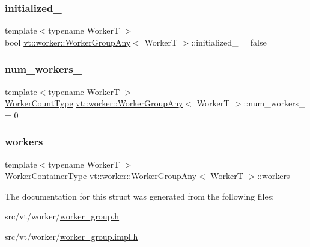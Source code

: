 \subsubsection{\texorpdfstring{initialized\+\_\+}{initialized\_}}
{\footnotesize\ttfamily template$<$typename WorkerT $>$ \\
bool \hyperlink{structvt_1_1worker_1_1_worker_group_any}{vt\+::worker\+::\+Worker\+Group\+Any}$<$ WorkerT $>$\+::initialized\+\_\+ = false\hspace{0.3cm}{\ttfamily [private]}}

\mbox{\label{structvt_1_1worker_1_1_worker_group_any_a84a8e36ce6d70e66b712ce04f224fd64}} 
\subsubsection{\texorpdfstring{num\+\_\+workers\+\_\+}{num\_workers\_}}
{\footnotesize\ttfamily template$<$typename WorkerT $>$ \\
\hyperlink{namespacevt_aa93398ea48f2cb6c188512250f7cc248}{Worker\+Count\+Type} \hyperlink{structvt_1_1worker_1_1_worker_group_any}{vt\+::worker\+::\+Worker\+Group\+Any}$<$ WorkerT $>$\+::num\+\_\+workers\+\_\+ = 0\hspace{0.3cm}{\ttfamily [private]}}

\mbox{\label{structvt_1_1worker_1_1_worker_group_any_a370802bca31db13895b73f19d699ea3b}} 
\subsubsection{\texorpdfstring{workers\+\_\+}{workers\_}}
{\footnotesize\ttfamily template$<$typename WorkerT $>$ \\
\hyperlink{structvt_1_1worker_1_1_worker_group_any_ad7e74c099f11c75bc35c838baedaa2cd}{Worker\+Container\+Type} \hyperlink{structvt_1_1worker_1_1_worker_group_any}{vt\+::worker\+::\+Worker\+Group\+Any}$<$ WorkerT $>$\+::workers\+\_\+\hspace{0.3cm}{\ttfamily [private]}}



The documentation for this struct was generated from the following files\+:\begin{DoxyCompactItemize}
\item 
src/vt/worker/\hyperlink{worker__group_8h}{worker\+\_\+group.\+h}\item 
src/vt/worker/\hyperlink{worker__group_8impl_8h}{worker\+\_\+group.\+impl.\+h}\end{DoxyCompactItemize}
